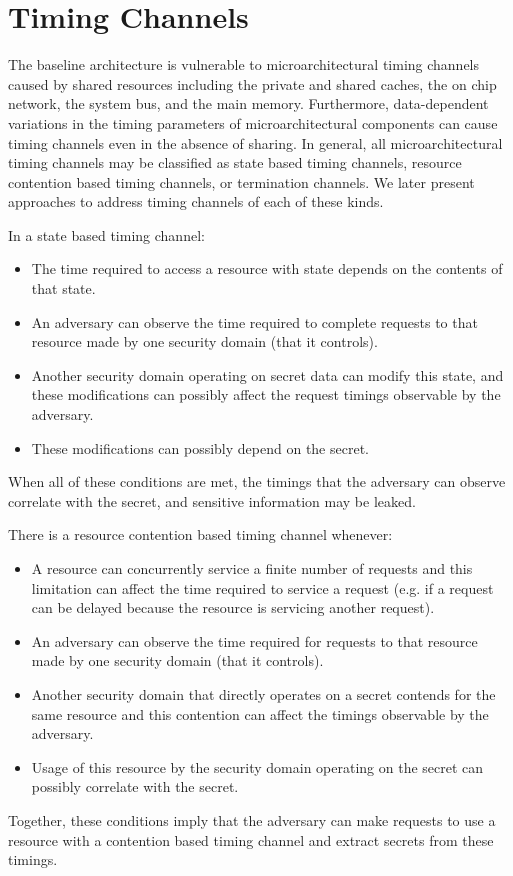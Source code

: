\section{Timing Channels}
\label{sec:tc_sources}
The baseline architecture is vulnerable to microarchitectural timing channels 
caused by shared resources including the private and shared caches, the on chip 
network, the system bus, and the main memory. Furthermore, data-dependent 
variations in the timing parameters of microarchitectural components can cause 
timing channels even in the absence of sharing. In general, all 
microarchitectural timing channels may be classified as state based timing 
channels, resource contention based timing channels, or termination channels.  
We later present approaches to address timing channels of each of these kinds.

In a state based timing channel:
\begin{itemize}
    \item The time required to access a resource with state depends on the 
        contents of that state. 
    \item An adversary can observe the time required to complete requests to 
        that resource made by one security domain (that it controls).
    \item Another security domain operating on secret data can modify this 
        state, and these modifications can possibly affect the request timings 
        observable by the adversary.
    \item These modifications can possibly depend on the secret.
\end{itemize}
When all of these conditions are met, the timings that the adversary can 
observe correlate with the secret, and sensitive information may be leaked.

There is a resource contention based timing channel whenever:
\begin{itemize}
    \item A resource can concurrently service a finite number of requests and 
        this limitation can affect the time required to service a request (e.g.  
        if a request can be delayed because the resource is servicing another 
        request).
    \item An adversary can observe the time required for requests to that 
        resource made by one security domain (that it controls).
    \item Another security domain that directly operates on a secret contends 
        for the same resource and this contention can affect the timings 
        observable by the adversary.
    \item Usage of this resource by the security domain operating on the secret 
        can possibly correlate with the secret.
\end{itemize}
Together, these conditions imply that the adversary can make requests to use a 
resource with a contention based timing channel and extract secrets from these 
timings.

